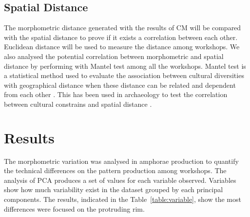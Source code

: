 \documentclass[review]{elsarticle}
\newcommand{\memo}[2]{\textcolor{#1}{#2}}
\newcommand{\xavi}[1]{\memo{orange}{xavi: #1\\}}
\begin{document}

\subsection{Spatial Distance}

The morphometric distance generated with the results of CM will be compared with the spatial distance to prove if it exists a correlation between each other. Euclidean distance will be used to measure the distance among workshops. We also analysed the potential correlation between morphometric and spatial distance by performing with Mantel test among all the workshops. Mantel test is a statistical method used to evaluate the association between cultural diversities with geographical distance when these distance can be related and dependent from each other \citep{mantel_detection_1967, diniz-filho_mantel_2013}. This has been used in archaeology to test the correlation between cultural constrains and spatial distance \citep{crema_culture_2014}.  





\section{Results}

The morphometric variation was analysed in amphorae production to quantify the technical differences on the pattern production among workshops. 
The analysis of PCA produces a set of values for each variable observed. Variables show how much variability exist in the dataset grouped by each principal components. The results, indicated in the Table~\ref{table:variable}, show the most differences were focused on the protruding rim. 
\end{document}
